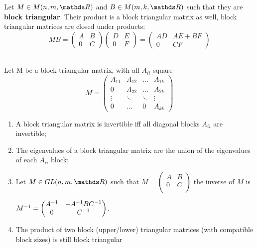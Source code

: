 \documentclass[computational_mathematics.tex]{subfiles}
\begin{document}
\begin{proposition}
  Let $M \in M(n, m, \R)$ and $B \in M(m, k, \R)$ such that they are \textbf{block triangular}.
  Their product is a block triangular matrix as well, block triangular matrices
are closed under products:
  $$M B 
  = \begin{pmatrix}
    A & B\\
    0 & C
  \end{pmatrix}
  \begin{pmatrix}
    D & E\\
    0 & F
  \end{pmatrix}
  = 
  \begin{pmatrix}
    AD & AE + BF\\
    0 & CF
  \end{pmatrix}$$
\end{proposition}

\begin{proposition}~\\
    Let M be a block triangular matrix, with all $A_{ii}$ square
    $$M 
      = \begin{pmatrix}
        A_{11}  & A_{12} & ... & A_{1k}\\
        0       & A_{22} & ... & A_{2k}\\
        \vdots  &\ddots & \ddots & \vdots\\
        0       & ... & 0 & A_{kk}
      \end{pmatrix}$$ 
    \begin{enumerate}
      \item A block triangular matrix is invertible iff all diagonal blocks $A_{ii}$ are invertible;
      \item The eigenvalues of a block triangular matrix are the union of the eigenvalues of each $A_{ii}$ block;
      \item Let $M \in GL(n, m, \R)$ such that $M= 
        \begin{pmatrix}
          A & B\\
          0 & C\\
        \end{pmatrix}$ 
       the inverse of $M$ is 
        
        ${M}^{-1} = 
        \begin{pmatrix}
          {A}^{-1} & -{A}^{-1}B{C}^{-1}\\
          0 & {C}^{-1}
        \end{pmatrix}$.
      \item The product of two block (upper/lower) triangular matrices
(with compatible block sizes) is still block triangular
    \end{enumerate}
  \end{proposition}
\end{document}

